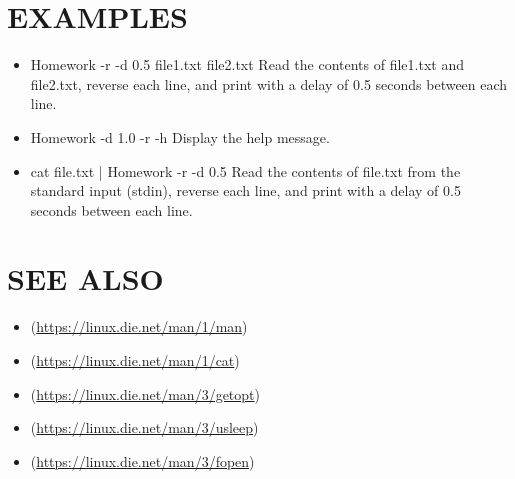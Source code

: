 \documentclass[11pt]{article}
\begin{document}
\section{EXAMPLES}
\label{sec:orga129032}

\begin{itemize}
\item Homework -r -d 0.5 file1.txt file2.txt
Read the contents of file1.txt and file2.txt, reverse each line, and print with a delay of 0.5 seconds between each line.

\item Homework -d 1.0 -r -h
Display the help message.

\item cat file.txt | Homework -r -d 0.5
Read the contents of file.txt from the standard input (stdin), reverse each line, and print with a delay of 0.5 seconds between each line.
\end{itemize}
\section{SEE ALSO}
\label{sec:orgc21d0f7}

\begin{itemize}
\item\relax [man(1)](\url{https://linux.die.net/man/1/man})
\item\relax [cat(1)](\url{https://linux.die.net/man/1/cat})
\item\relax [getopt(3)](\url{https://linux.die.net/man/3/getopt})
\item\relax [usleep(3)](\url{https://linux.die.net/man/3/usleep})
\item\relax [fopen(3)](\url{https://linux.die.net/man/3/fopen})
\end{itemize}
\end{document}
